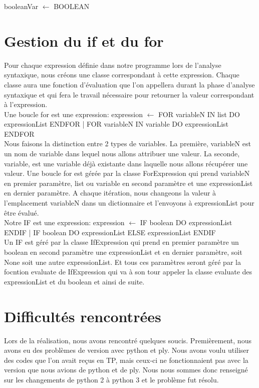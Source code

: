 ﻿\documentclass{report}
\begin{document}
booleanVar $\leftarrow$ BOOLEAN\\


\section*{ Gestion du if et du for}

Pour chaque expression définie dans notre programme lors de l'analyse syntaxique, nous créons une classe correspondant à cette expression. Chaque classe aura une fonction d'évaluation que l'on appellera durant la phase d'analyse syntaxique et qui fera le travail nécessaire pour retourner la valeur correspondant à l'expression.\\


Une boucle for est une expression: expression $\leftarrow$ FOR variableN IN list DO expressionList ENDFOR | FOR variableN IN variable DO expressionList ENDFOR\\ 
Nous faisons la distinction entre 2 types de variables. La première, variableN est un nom de variable dans lequel nous allons attribuer une valeur. La seconde, variable, est une variable déjà existante dans laquelle nous allons récupérer une valeur. Une boucle for est gérée par la classe ForExpression qui prend variableN en premier paramètre, list ou variable en second paramètre et une expressionList en dernier paramètre. A chaque itération, nous changeons la valeur à l'emplacement variableN dans un dictionnaire et l'envoyons à expressionList pour être évalué.\\

Notre IF est une expression: expression $\leftarrow$ IF boolean DO expressionList ENDIF | IF boolean DO expressionList ELSE expressionList ENDIF\\
Un IF est géré par la classe IfExpression qui prend en premier paramètre un boolean en second paramètre une expressionList et en dernier paramètre, soit None soit une autre expressionList. Et tous ces paramètres seront géré par la focntion evaluate de IfExpression qui va à son tour appeler la classe evaluate des expressionList et du boolean et ainsi de suite.


\section*{ Difficultés rencontrées }
Lors de la réalisation, nous avons rencontré quelques soucis. Premièrement, nous avons eu des problèmes de version avec python et ply. Nous avons voulu utiliser des codes que l'on avait reçus en TP, mais ceux-ci ne fonctionnaient pas avec la version que nous avions de python et de ply. Nous nous sommes donc renseigné sur les changements de python 2 à python 3 et le problème fut résolu.\\
\end{document}
